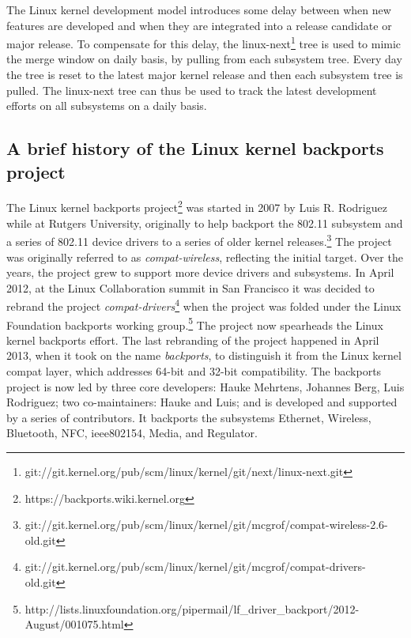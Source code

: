 The Linux kernel development model introduces some delay between when new
features are developed and when they are integrated into a release
candidate or major release.  To compensate for this delay, the
linux-next\footnote{git://git.kernel.org/pub/scm/linux/kernel/git/next/linux-next.git}
tree is used to mimic the merge window on daily basis, by pulling from each
subsystem tree. Every day the tree is reset to the latest major
kernel release and then each subsystem tree is pulled. The linux-next tree
can thus be used to track the latest development efforts on all subsystems on a
daily basis.

\subsection{A brief history of the Linux kernel backports project}

The Linux kernel backports
project\footnote{https://backports.wiki.kernel.org} was started in 2007 by
Luis R. Rodriguez while at Rutgers University, originally to help backport
the 802.11 subsystem and a series of 802.11 device drivers to a series of
older kernel
releases.\footnote{git://git.kernel.org/pub/scm/linux/kernel/git/mcgrof/compat-wireless-2.6-old.git}
The project was originally referred to as {\em compat-wireless}, reflecting
the initial target.  Over the years, the project grew to support more
device drivers and subsystems. In April 2012, at the Linux Collaboration
summit in San Francisco it was decided to rebrand the project {\em
  compat-drivers}\footnote{git://git.kernel.org/pub/scm/linux/kernel/git/mcgrof/compat-drivers-old.git}
when the project was folded under the Linux Foundation backports working
group.\footnote{http://lists.linuxfoundation.org/pipermail/lf\_driver\_backport/2012-August/001075.html}
The project now spearheads the Linux kernel backports effort. The last
rebranding of the project happened in April 2013, when it took on the name
{\em backports}, to distinguish it from the Linux kernel compat layer,
which addresses 64-bit and 32-bit compatibility.  The backports project is
now led by three core developers: Hauke Mehrtens, Johannes Berg,
Luis Rodriguez; two co-maintainers: Hauke and Luis; and is developed
and supported by a series of contributors.  It backports the subsystems Ethernet,
Wireless, Bluetooth, NFC, ieee802154, Media, and Regulator.


